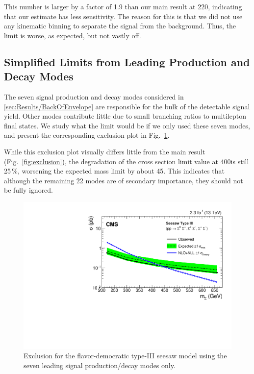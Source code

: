 This number is larger by a factor of 1.9 than our main result at 220\GeV, indicating that our estimate has less sensitivity. The reason for this is that we did not use any kinematic binning to separate the signal from the background. Thus, the limit is worse, as expected, but not vastly off.

\subsection{Simplified Limits from Leading Production and Decay Modes}
The seven signal production and decay modes considered in \ref{sec:Results/BackOfEnvelope} are responsible for the bulk of the detectable signal yield. Other modes contribute little due to small branching ratios to multilepton final states. We study what the limit would be if we only used these seven modes, and present the corresponding exclusion plot in Fig.~\ref{fig:exclusion-leading7}.

While this exclusion plot visually differs little from the main result (Fig.~\ref{fig:exclusion}), the degradation of the cross section limit value at 400\GeV is still 25\,\%, worsening the expected mass limit by about 45\GeV. This indicates that although the remaining 22 modes are of secondary importance, they should not be fully ignored.

\begin{figure}
\begin{center}
	\includegraphics[width=.8\textwidth]{Results/exclusion-leading7}
	\caption{Exclusion for the flavor-democratic type-III seesaw model using the seven leading signal production/decay modes only.
	\label{fig:exclusion-leading7}}
\end{center}
\end{figure}

